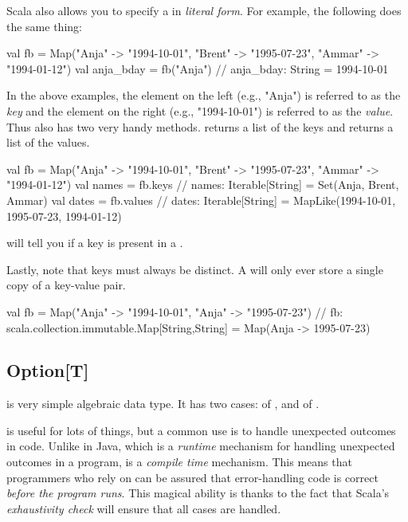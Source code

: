 \documentclass{book}
\begin{document}
Scala also allows you to specify a  in \emph{literal form}.  For example, the following does the same thing:

\begin{scalacode}
val fb = Map("Anja" -> "1994-10-01", "Brent" -> "1995-07-23", "Ammar" -> "1994-01-12")
val anja_bday = fb("Anja")
// anja_bday: String = 1994-10-01
\end{scalacode}

In the above examples, the element on the left (e.g., "Anja") is referred to as the \emph{key} and the element on the right (e.g., "1994-10-01") is referred to as the \emph{value}.  Thus  also has two very handy methods.   returns a list of the keys and  returns a list of the values.

\begin{scalacode}
val fb = Map("Anja" -> "1994-10-01", "Brent" -> "1995-07-23", "Ammar" -> "1994-01-12")
val names = fb.keys
// names: Iterable[String] = Set(Anja, Brent, Ammar)
val dates = fb.values
// dates: Iterable[String] = MapLike(1994-10-01, 1995-07-23, 1994-01-12)
\end{scalacode}

 will tell you if a key is present in a .

Lastly, note that keys must always be distinct.  A  will only ever store a single copy of a key-value pair.

\begin{scalacode}
val fb = Map("Anja" -> "1994-10-01", "Anja" -> "1995-07-23")
// fb: scala.collection.immutable.Map[String,String] = Map(Anja -> 1995-07-23)
\end{scalacode}


\subsection{Option[T]}

 is very simple algebraic data type.  It has two cases:  of , and  of .

 is useful for lots of things, but a common use is to handle unexpected outcomes in code.  Unlike  in Java, which is a \emph{runtime} mechanism for handling unexpected outcomes in a program,  is a \emph{compile time} mechanism.  This means that programmers who rely on  can be assured that error-handling code is correct \emph{before the program runs}.  This magical ability is thanks to the fact that Scala's \emph{exhaustivity check} will ensure that all cases are handled.
\end{document}
